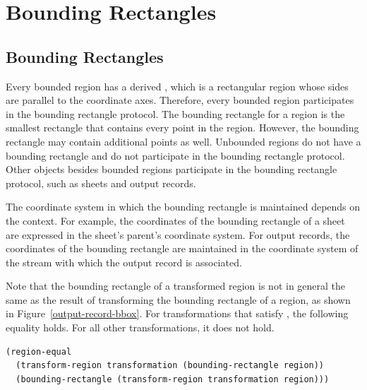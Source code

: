 
\chapter {Bounding Rectangles}
\label {bboxes}

\section {Bounding Rectangles}

Every bounded region has a derived , which is a
rectangular region whose sides are parallel to the coordinate axes.  Therefore,
every bounded region participates in the bounding rectangle protocol.  The
bounding rectangle for a region is the smallest rectangle that contains every
point in the region.  However, the bounding rectangle may contain additional
points as well.  Unbounded regions do not have a bounding rectangle and do not
participate in the bounding rectangle protocol.  Other objects besides bounded
regions participate in the bounding rectangle protocol, such as sheets and
output records.

The coordinate system in which the bounding rectangle is maintained depends on
the context.  For example, the coordinates of the bounding rectangle of a sheet
are expressed in the sheet's parent's coordinate system.  For output records,
the coordinates of the bounding rectangle are maintained in the coordinate
system of the stream with which the output record is associated.

Note that the bounding rectangle of a transformed region is not in general the
same as the result of transforming the bounding rectangle of a region, as shown
in Figure~\ref{output-record-bbox}.  For transformations that satisfy
, the following equality holds.  For all other
transformations, it does not hold.

\begin{verbatim}
(region-equal
  (transform-region transformation (bounding-rectangle region))
  (bounding-rectangle (transform-region transformation region)))
\end{verbatim}

